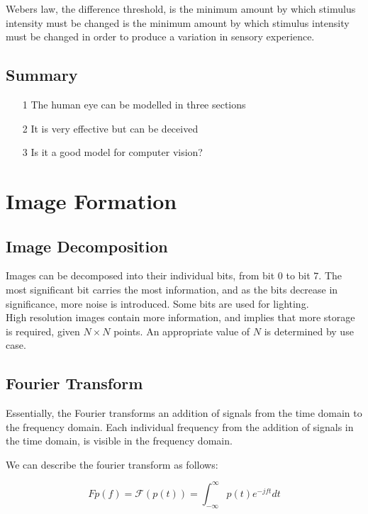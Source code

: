 Webers law, the difference threshold, is the minimum amount by which stimulus intensity must be changed is the minimum amount by which stimulus intensity must be changed in order to produce a variation in sensory experience.

\subsection{Summary}
\begin{itemize}
    \itemsep0em
    \item [1] The human eye can be modelled in three sections
    \item [2] It is very effective but can be deceived
    \item [3] Is it a good model for computer vision?
\end{itemize}

\section{Image Formation}

\subsection{Image Decomposition}
Images can be decomposed into their individual bits, from bit $0$ to bit $7$. The most significant bit carries the most information, and as the bits decrease in significance, more noise is introduced. Some bits are used for lighting. \\
High resolution images contain more information, and implies that more storage is required, given $N \times N$ points. An appropriate value of $N$ is determined by use case.

\subsection{Fourier Transform}
Essentially, the Fourier transforms an addition of signals from the time domain to the frequency domain. Each individual frequency from the addition of signals in the time domain, is visible in the frequency domain.

We can describe the fourier transform as follows:

\begin{equation}
    Fp(f) = \mathcal{F}(p(t)) = \int_{-\infty}^{\infty}p(t)e^{-jft}dt
    \label{eq:fourier}
\end{equation}

